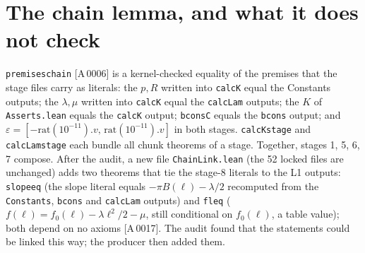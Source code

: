 \documentclass[10pt]{article}
\newcommand{\tg}[2]{\texorpdfstring{\textsf{[#1\,#2]}}{}}  %
\newcommand{\lean}[1]{\texttt{#1}}
\renewcommand{\_}{\textunderscore\allowbreak}
\begin{document}
\section{The chain lemma, and what it does not check}\label{sec:notchecked}
\lean{premises\_chain} \tg{A}{0006} is a kernel-checked equality of the premises that the stage files carry as literals: the $p,R$ written into \lean{calcK} equal the Constants outputs; the $\lambda,\mu$ written into \lean{calcK} equal the \lean{calcLam} outputs; the $K$ of \texttt{Asserts.lean} equals the \lean{calcK} output; \lean{bconsC} equals the \lean{bcons} output; and $\varepsilon=[-\mathrm{rat}(10^{-11}).v,\,\mathrm{rat}(10^{-11}).v]$ in both stages. \lean{calcK\_stage} and \lean{calcLam\_stage} each bundle all chunk theorems of a stage. Together, stages 1, 5, 6, 7 compose. After the audit, a new file \texttt{ChainLink.lean} (the 52 locked files are unchanged) adds two theorems that tie the stage-8 literals to the L1 outputs: \lean{slope\_eq} (the slope literal equals $-\pi B(\ell)-\lambda/2$ recomputed from the \lean{Constants}, \lean{bcons} and \lean{calcLam} outputs) and \lean{fl\_eq} ($f(\ell)=f_0(\ell)-\lambda\ell^2/2-\mu$, still conditional on $f_0(\ell)$, a table value); both depend on no axioms \tg{A}{0017}. The audit found that the statements could be linked this way; the producer then added them.
\end{document}
